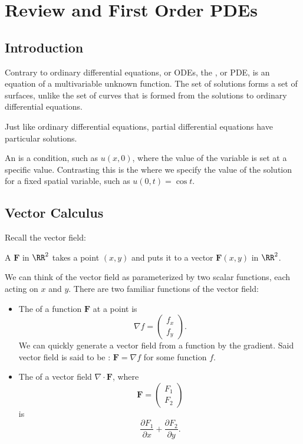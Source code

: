 \chapter{Review and First Order PDEs}

\section{Introduction}
Contrary to ordinary differential equations, or ODEs, the , or PDE, is an equation of a multivariable unknown function. The set of solutions forms a set of surfaces, unlike the set of curves that is formed from the solutions to ordinary differential equations. 

Just like ordinary differential equations, partial differential equations have particular solutions. 
\begin{definition}{}{}
An  is a condition, such as $u(x,0)$, where the value of the variable is set at a specific value. Contrasting this is the  where we specify the value of the solution for a fixed spatial variable, such as $u(0,t) = \cos{t}$. 
\end{definition}

\section{Vector Calculus}
Recall the vector field:
\begin{definition}{}{}
A  $\mathbf{F}$ in $\RR^2$ takes a point $(x,y)$ and puts it to a vector $\mathbf{F}(x,y)$ in $\RR^2$.
\end{definition}

We can think of the vector field as parameterized by two scalar functions, each acting on $x$ and $y$. There are two familiar functions of the vector field: 
\begin{itemize}
\item The  of a function $\mathbf{F}$ at a point is 
\[ \nabla f = \begin{pmatrix} f_x \\ f_y \end{pmatrix}. \] 
We can quickly generate a vector field from a function by the gradient. Said vector field is said to be : $\mathbf{F} = \nabla f$ for some function $f$. 
\item The  of a vector field $\nabla \cdot \mathbf{F}$, where 
\[ \mathbf{F} = \begin{pmatrix} F_1 \\ F_2 \end{pmatrix} \] is 
\[ \frac{\partial F_1}{\partial x} + \frac{\partial F_2}{\partial y}. \] 
\end{itemize}

